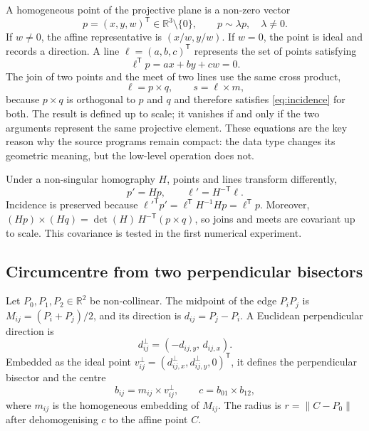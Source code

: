\documentclass[11pt,a4paper]{article}
\theoremstyle{plain}
\theoremstyle{definition}
\theoremstyle{remark}
\newcommand{\R}{\mathbb{R}}
\newcommand{\T}{\mathsf{T}}
\newcommand{\norm}[1]{\left\lVert#1\right\rVert}
\begin{document}
A homogeneous point of the projective plane is a non-zero vector
\begin{equation}
  p=(x,y,w)^{\T}\in\R^3\setminus\{0\},
  \qquad p\sim\lambda p,\quad\lambda\neq 0.
  \label{eq:homogeneous-point}
\end{equation}
If $w\neq 0$, the affine representative is $(x/w,y/w)$. If $w=0$, the point is
ideal and records a direction. A line $\ell=(a,b,c)^{\T}$ represents the set
of points satisfying
\begin{equation}
  \ell^{\T}p=ax+by+cw=0.
  \label{eq:incidence}
\end{equation}
The join of two points and the meet of two lines use the same cross product,
\begin{equation}
  \ell=p\times q,
  \qquad
  s=\ell\times m,
  \label{eq:projective-join-meet}
\end{equation}
because $p\times q$ is orthogonal to $p$ and $q$ and therefore satisfies
\cref{eq:incidence} for both. The result is defined up to scale; it vanishes if
and only if the two arguments represent the same projective element. These
equations are the key reason why the source programs remain compact: the data
type changes its geometric meaning, but the low-level operation does not.

Under a non-singular homography $H$, points and lines transform differently,
\begin{equation}
  p'=Hp,
  \qquad
  \ell'=H^{-\T}\ell.
  \label{eq:homography}
\end{equation}
Incidence is preserved because ${\ell'}^{\T}p'=\ell^{\T}H^{-1}Hp=\ell^{\T}p$.
Moreover, $(Hp)\times(Hq)=\det(H)\,H^{-\T}(p\times q)$, so joins and meets are
covariant up to scale. This covariance is tested in the first numerical
experiment.

\subsection{Circumcentre from two perpendicular bisectors}

Let $P_0,P_1,P_2\in\R^2$ be non-collinear. The midpoint of the edge $P_iP_j$ is
$M_{ij}=(P_i+P_j)/2$, and its direction is $d_{ij}=P_j-P_i$. A Euclidean
perpendicular direction is
\begin{equation}
  d_{ij}^{\perp}=(-d_{ij,y},\,d_{ij,x}).
\end{equation}
Embedded as the ideal point $v_{ij}^{\perp}=(d_{ij,x}^{\perp},
d_{ij,y}^{\perp},0)^{\T}$, it defines the perpendicular bisector and the centre
\begin{equation}
  b_{ij}=m_{ij}\times v_{ij}^{\perp},
  \qquad
  c=b_{01}\times b_{12},
  \label{eq:circumcenter-projective}
\end{equation}
where $m_{ij}$ is the homogeneous embedding of $M_{ij}$. The radius is
$r=\norm{C-P_0}$ after dehomogenising $c$ to the affine point $C$.
\end{document}
